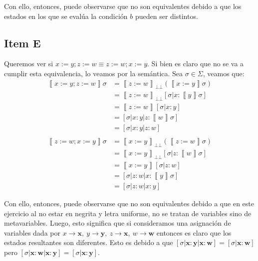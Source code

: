 \documentclass{article}
\newcommand{\sem}[1]{\left\llbracket #1\right\rrbracket}
\newcommand{\bbot}{\bot\!\!\!\bot}
\begin{document}
Con ello, entonces, puede observarse que no son equivalentes debido a que los estados en los que se evalúa la condición $b$ pueden ser distintos.

\subsection*{Item E}
Queremos ver si $x := y; z := w \equiv z := w; x := y$.
Si bien es claro que no se va a cumplir esta equivalencia, lo veamos por la semántica.
Sea $\sigma \in \Sigma$, veamos que:
\begin{equation*}
  \begin{aligned}
    \sem{x := y; z := w}\sigma &= \sem{z := w}_{\bbot}(\sem{x := y}\sigma) \\ 
                               &= \sem{z := w}_{\bbot}[\sigma | x : \sem{y}\sigma] \\ 
                               &= \sem{z := w}[\sigma | x : y] \\ 
                               &= [\sigma | x : y | z : \sem{w}\sigma] \\ 
                               &= [\sigma | x : y | z : w] \\ 
                               \\ 
    \sem{z := w; x := y}\sigma &= \sem{x := y}_{\bbot}(\sem{z := w}\sigma) \\ 
                               &= \sem{x := y}_{\bbot}[\sigma | z : \sem{w}\sigma] \\ 
                               &= \sem{x := y}[\sigma | z : w] \\ 
                               &= [\sigma | z : w | x : \sem{y}\sigma] \\ 
                               &= [\sigma | z : w | x : y]
  \end{aligned}
\end{equation*}

Con ello, entonces, puede observarse que no son equivalentes debido a que en este ejercicio al no estar en negrita y letra uniforme, no se tratan de variables sino de metavariables.
Luego, esto significa que si consideramos una asignación de variables dada por $x \to \textbf{x},\ y \to \textbf{y},\ z \to \textbf{x},\ w \to \textbf{w}$ entonces es claro que los estados resultantes son diferentes.
Esto es debido a que $[\sigma | \textbf{x} : \textbf{y} | \textbf{x} : \textbf{w}] = [\sigma | \textbf{x} : \textbf{w}]$ pero $[\sigma | \textbf{x} : \textbf{w} | \textbf{x} : \textbf{y}] = [\sigma | \textbf{x} : \textbf{y}]$.
\end{document}
